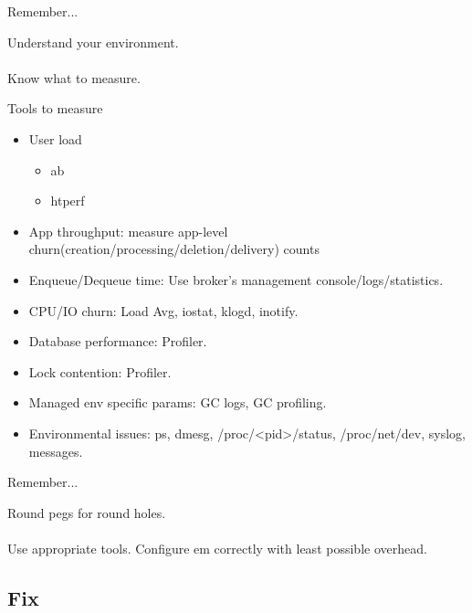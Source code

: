 \documentclass{beamer}
\begin{document}
\begin{frame}{Remember...}
  \begin{center}
    \large{Understand your environment.}\quad\\
    \quad\\
    \small{Know what to measure.}
  \end{center}
\end{frame}

\begin{frame}{Tools to measure}
  \begin{itemize}
    \item User load
      \begin{itemize}
        \item ab
        \item htperf
      \end{itemize}
      \pause
    \item App throughput: measure app-level churn(creation/processing/deletion/delivery) counts
      \pause
    \item Enqueue/Dequeue time: Use broker's management console/logs/statistics.
      \pause
    \item CPU/IO churn: Load Avg, iostat, klogd, inotify.
      \pause
    \item Database performance: Profiler.
      \pause
    \item Lock contention: Profiler.
      \pause
    \item Managed env specific params: GC logs, GC profiling.
      \pause
    \item Environmental issues: ps, dmesg, /proc/<pid>/status, /proc/net/dev, syslog, messages.
  \end{itemize}
\end{frame}

\begin{frame}{Remember...}
  \begin{center}
    \large{Round pegs for round holes.}\quad\\
    \quad\\
    \small{Use appropriate tools. Configure em correctly with least possible overhead.}
  \end{center}
\end{frame}

\subsection{Fix}
\end{document}
